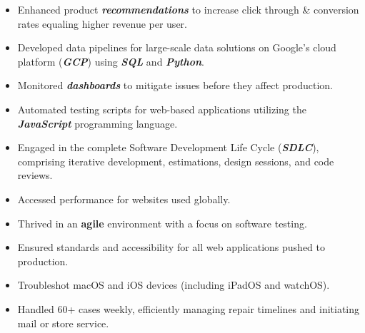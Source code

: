 \documentclass[10pt,a4paper,ragged2e,withhyper]{altacv}
\begin{document}
\begin{paracol}{2}

\begin{itemize}
\item Enhanced product \textbf{\textit{recommendations}} to increase click through \& conversion rates equaling higher revenue per user. 
\item Developed data pipelines for large-scale data solutions on Google's cloud platform (\textbf{\textit{GCP}}) using \textbf{\textit{SQL}} and \textbf{\textit{Python}}.
\item Monitored \textbf{\textit{dashboards}} to mitigate issues before they affect production.
\item Automated testing scripts for web-based applications utilizing the \textbf{\textit{JavaScript}} programming language. 
\item Engaged in the complete Software Development Life Cycle (\textbf{\textit{SDLC}}), comprising iterative development, estimations, design sessions, and code reviews.
\end{itemize}

\divider

\begin{itemize}
\item Accessed performance for websites used globally. 
\item Thrived in an \textbf{agile} environment with a focus on software testing. 
\item Ensured standards and accessibility for all web applications pushed to production.
\end{itemize}

\divider

\begin{itemize}
\item Troubleshot macOS and iOS devices (including iPadOS and watchOS). 
\item Handled 60+ cases weekly, efficiently managing repair timelines and initiating mail or store service.
\end{itemize}



\end{paracol}
\end{document}
